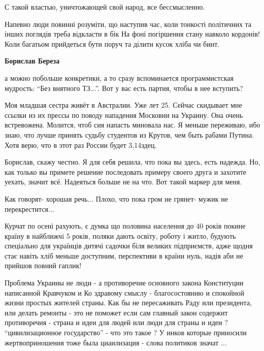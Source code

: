 \begin{itemize}
С такой властью, уничтожающей свой народ, все бессмысленно.


Напевно люди повинні розуміти, що наступив час, коли тонкості політичних та інших
поглядів треба відкласти в бік На фоні погіршення стану навколо кордонів! Коли
багатьом прийдеться бути поруч та ділити кусок хліба чи бинт.


\textbf{Борислав Береза} 

а можно побольше конкретики, а то сразу вспоминается программистская мудрость:
\enquote{Без внятного ТЗ...}. Вот у вас есть партия, чтобы в нее вступить?


Моя младшая сестра живёт в Австралии. Уже лет 25. Сейчас скидывает мне ссылки
из их прессы по поводу нападения Московии на Украину. Она очень встревожена.
Молится, чтоб сия напасть миновала нас. Я меньше переживаю, ибо знаю, что лучше
принять судьбу студентов из Крутов, чем быть рабами Путина. Хотя верю, что в
этот раз России будет 3,14здец.


Борислав, скажу честно. Я для себя решила, что пока вы здесь, есть надежда. Но,
как только вы примете решение последовать примеру своего друга и захотите
уехать, значит всё. Надеяться больше не на что. Вот такой маркер для меня.

Как говорят- хорошая речь...
Плохо, что пока гром не грянет- мужик не перекрестится...


Курчат по осені рахують, є думка що половина населення до 40 років покине
країну в найближчі 5 років, поляки дають освіту, роботу і житло, будують
спеціально для українців дитячі садочки біля великих підприємств, адже щодня
стає навіть хліб меньше доступним, перспективи в країни нуль, надія аби не
прийшов повний гаплик!


Проблема Украины не люди - а противоречие основного закона Конституции
написанной Кравчуком и Ко здравому смыслу - благосостоянию и спокойной жизни
простых жителей страны. Как бы не пересаживать Раду или президента, или делать
ремонты - это не поможет если сам главный закон содержит противоречия - страна
и идеи для людей или люди для страны и идеи ? \enquote{цивилизационное государство} -
что это такое ? У инков которые приносили жертвоприношения тоже была
циаилизация - слова политиков значат ...



\end{itemize}
